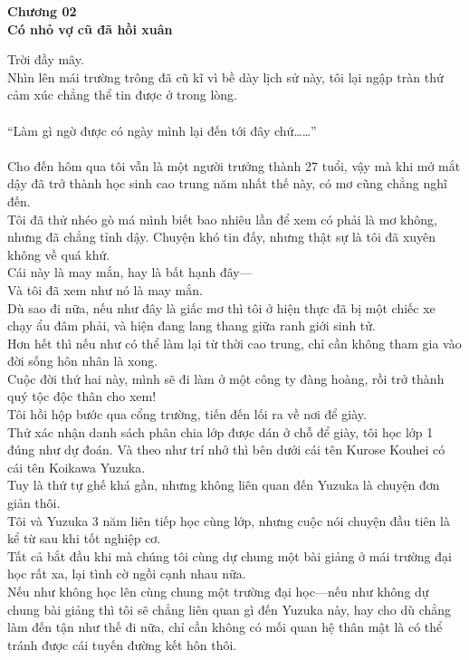 \documentclass[12pt,a4paper, twosides]{book}
\begin{document}
    \begin{center}
    \textbf{\large Chương 02 \\ Có nhỏ vợ cũ đã hồi xuân}
    \end{center}
    \noindent
Trời đầy mây.\\
Nhìn lên mái trường trông đã cũ kĩ vì bề dày lịch sử này, tôi lại ngập tràn thứ cảm xúc chẳng thể tin được ở trong lòng.\\
\\
“Làm gì ngờ được có ngày mình lại đến tới đây chứ……”\\
\\
Cho đến hôm qua tôi vẫn là một người trưởng thành 27 tuổi, vậy mà khi mở mắt dậy đã trở thành học sinh cao trung năm nhất thế này, có mơ cũng chẳng nghĩ đến.\\
Tôi đã thử nhéo gò má mình biết bao nhiêu lần để xem có phải là mơ không, nhưng đã chẳng tỉnh dậy. Chuyện khó tin đấy, nhưng thật sự là tôi đã xuyên không về quá khứ.\\
Cái này là may mắn, hay là bất hạnh đây—\\
Và tôi đã xem như nó là may mắn.\\
Dù sao đi nữa, nếu như đây là giấc mơ thì tôi ở hiện thực đã bị một chiếc xe chạy ẩu đâm phải, và hiện đang lang thang giữa ranh giới sinh tử.\\
Hơn hết thì nếu như có thể làm lại từ thời cao trung, chỉ cần không tham gia vào đời sống hôn nhân là xong.\\
Cuộc đời thứ hai này, mình sẽ đi làm ở một công ty đàng hoàng, rồi trở thành quý tộc độc thân cho xem!\\
Tôi hồi hộp bước qua cổng trường, tiến đến lối ra về nơi để giày.\\
Thử xác nhận danh sách phân chia lớp được dán ở chỗ để giày, tôi học lớp 1 đúng như dự đoán. Và theo như trí nhớ thì bên dưới cái tên Kurose Kouhei có cái tên Koikawa Yuzuka.\\
Tuy là thứ tự ghế khá gần, nhưng không liên quan đến Yuzuka là chuyện đơn giản thôi.\\
Tôi và Yuzuka 3 năm liên tiếp học cùng lớp, nhưng cuộc nói chuyện đầu tiên là kể từ sau khi tốt nghiệp cơ.\\
Tất cả bắt đầu khi mà chúng tôi cùng dự chung một bài giảng ở mái trường đại học rất xa, lại tình cờ ngồi cạnh nhau nữa.\\
Nếu như không học lên cùng chung một trường đại học—nếu như không dự chung bài giảng thì tôi sẽ chẳng liên quan gì đến Yuzuka này, hay cho dù chẳng làm đến tận như thế đi nữa, chỉ cần không có mối quan hệ thân mật là có thể tránh được cái tuyến đường kết hôn thôi.\\
\end{document}
